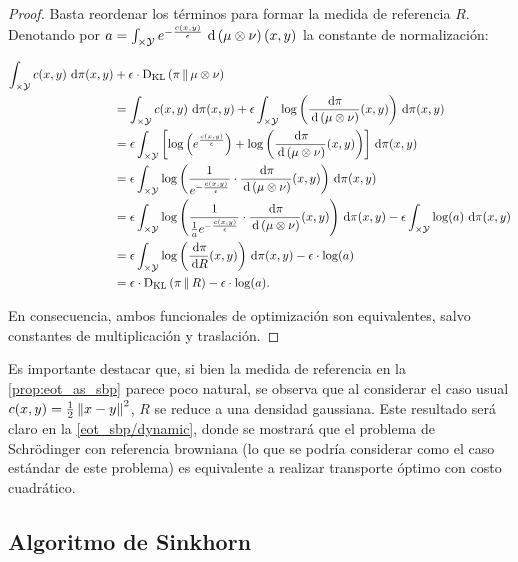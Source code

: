 \begin{proof}

	Basta reordenar los términos para formar la medida de referencia $R$. Denotando por $a=\int_{\times\mathcal{Y}} e^{-\frac{c(x,y)}{\epsilon}}\,\operatorname{d}\!\,\left(\mu\otimes\nu\right)(x,y)$ la constante de normalización:

	\begin{align*}
		\int_{\xspace\times\yspace} c(x,y) \d\pi(x,y) &+ \epsilon\cdot\KL{\pi}{\mu\otimes\nu}\\
		&= \int_{\xspace\times\yspace} c(x,y) \d\pi(x,y) + \epsilon \int_{\xspace\times\yspace} \log\parent{\frac{\d\pi}{\d\,\parent{\mu\otimes\nu}}(x,y)} \d\pi(x,y)\\
		&= \epsilon \int_{\xspace\times\yspace} \rparent{\log\parent{e^{\frac{c(x,y)}{\epsilon}}} + \log\parent{\frac{\d\pi}{\d\,\parent{\mu\otimes\nu}}(x,y)}} \d\pi(x,y)\\
		&= \epsilon \int_{\xspace\times\yspace} \log\parent{\frac{1}{e^{-\frac{c(x,y)}{\epsilon}}}\cdot\frac{\d\pi}{\d\,\parent{\mu\otimes\nu}}(x,y)} \d\pi(x,y)\\
		&= \epsilon \int_{\xspace\times\yspace} \log\parent{\frac{1}{\frac{1}{a}e^{-\frac{c(x,y)}{\epsilon}}}\cdot\frac{\d\pi}{\d\,\parent{\mu\otimes\nu}}(x,y)}\d\pi(x,y) - \epsilon\int_{\xspace\times\yspace} \log(a) \d\pi(x,y)\\
		&=\epsilon\int_{\xspace\times\yspace}\log\parent{\frac{\d\pi}{\d R}(x,y)}\d\pi(x,y)- \epsilon\cdot\log(a)\\
		&= \epsilon\cdot \KL{\pi}{R} - \epsilon\cdot\log(a).
	\end{align*}

	En consecuencia, ambos funcionales de optimización son equivalentes, salvo constantes de multiplicación y traslación.
	
\end{proof}

Es importante destacar que, si bien la medida de referencia en la \autoref{prop:eot_as_sbp} parece poco natural, se observa que al considerar el caso usual $c(x,y)=\frac{1}{2}\left\lVert x-y \right\rVert^2$, $R$ se reduce a una densidad gaussiana. Este resultado será claro en la \autoref{eot_sbp/dynamic}, donde se mostrará que el problema de Schrödinger con referencia browniana (lo que se podría considerar como el caso estándar de este problema) es equivalente a realizar transporte óptimo con costo cuadrático.

\subsection{Algoritmo de Sinkhorn}
\label{eot_sbp/static_sbp/sinkhorn}

